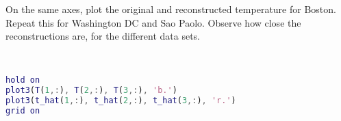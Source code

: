 On the same axes, plot the original and reconstructed temperature for Boston. Repeat this for Washington DC and Sao Paolo. Observe how close the reconstructions are, for the different data sets.

\begin{solution} \
    \begin{lstlisting}[language=Matlab]
hold on
plot3(T(1,:), T(2,:), T(3,:), 'b.')
plot3(t_hat(1,:), t_hat(2,:), t_hat(3,:), 'r.')
grid on
    \end{lstlisting}
\end{solution}